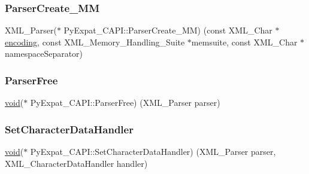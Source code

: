 \mbox{\label{struct_py_expat___c_a_p_i_abb499eb0db9d22b485ed45be20100bd9}} 
\subsubsection{\texorpdfstring{ParserCreate\_MM}{ParserCreate\_MM}}
{\footnotesize\ttfamily X\+M\+L\+\_\+\+Parser($\ast$ Py\+Expat\+\_\+\+C\+A\+P\+I\+::\+Parser\+Create\+\_\+\+MM) (const X\+M\+L\+\_\+\+Char $\ast$\mbox{\hyperlink{stringobject_8h_a8bf289d3d3f54f840150ecab442b16b1}{encoding}}, const X\+M\+L\+\_\+\+Memory\+\_\+\+Handling\+\_\+\+Suite $\ast$memsuite, const X\+M\+L\+\_\+\+Char $\ast$namespace\+Separator)}

\mbox{\label{struct_py_expat___c_a_p_i_a6f02d5578475c187cc6e187a15308eba}} 
\subsubsection{\texorpdfstring{ParserFree}{ParserFree}}
{\footnotesize\ttfamily \mbox{\hyperlink{_s_d_l__opengles2__gl2ext_8h_ae5d8fa23ad07c48bb609509eae494c95}{void}}($\ast$ Py\+Expat\+\_\+\+C\+A\+P\+I\+::\+Parser\+Free) (X\+M\+L\+\_\+\+Parser parser)}

\mbox{\label{struct_py_expat___c_a_p_i_a7440612167b3fa8089d41411a0904409}} 
\subsubsection{\texorpdfstring{SetCharacterDataHandler}{SetCharacterDataHandler}}
{\footnotesize\ttfamily \mbox{\hyperlink{_s_d_l__opengles2__gl2ext_8h_ae5d8fa23ad07c48bb609509eae494c95}{void}}($\ast$ Py\+Expat\+\_\+\+C\+A\+P\+I\+::\+Set\+Character\+Data\+Handler) (X\+M\+L\+\_\+\+Parser parser, X\+M\+L\+\_\+\+Character\+Data\+Handler handler)}

\mbox{\label{struct_py_expat___c_a_p_i_a9199d4d4f57dda08f2e798351cdbb7ab}} 
